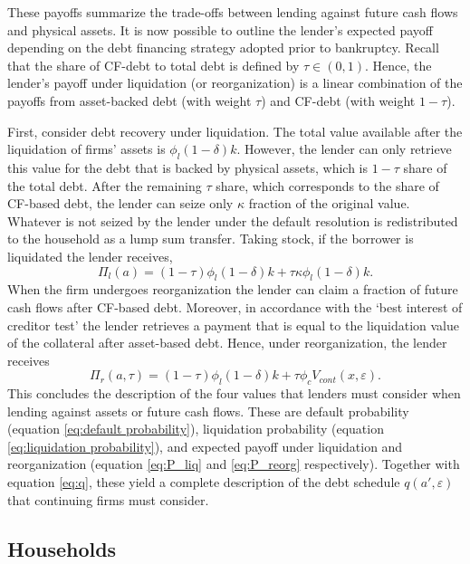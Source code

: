 \documentclass[12pt]{article}
\begin{document}
These payoffs summarize the trade-offs between lending against future cash flows and physical assets. It is now possible to outline the lender's expected payoff depending on the debt financing strategy adopted prior to bankruptcy. Recall that the share of CF-debt to total debt is defined by $\tau \in (0,1)$. Hence, the lender's payoff under liquidation (or reorganization) is a linear combination of the payoffs from asset-backed debt (with weight $\tau$) and CF-debt (with weight $1-\tau$). 

First, consider debt recovery under liquidation. The total value available after the liquidation of firms' assets is $\phi_l (1-\delta) k$. However, the lender can only retrieve this value for the debt that is backed by physical assets, which is $1-\tau$ share of the total debt. After the remaining $\tau$ share, which corresponds to the share of CF-based debt, the lender can seize only $\kappa$ fraction of the original value. Whatever is not seized by the lender under the default resolution is redistributed to the household as a lump sum transfer. Taking stock, if the borrower is liquidated the lender receives,
\begin{equation} \label{eq:P_liq} 
   \Pi_{l}(a) = (1-\tau) \phi_l (1-\delta) k +\tau \kappa \phi_l  (1-\delta) k. 
\end{equation}
When the firm undergoes reorganization the lender can claim a fraction of future cash flows after CF-based debt. Moreover, in accordance with the `best interest of creditor test' the lender retrieves a payment that is equal to the liquidation value of the collateral after asset-based debt. Hence, under reorganization, the lender receives
\begin{equation}  \label{eq:P_reorg}
   \Pi_{r}(a,\tau) = (1-\tau) \phi_l (1-\delta) k +\tau \phi_c V_{cont} (x, \varepsilon).
\end{equation}
This concludes the description of the four values that lenders must consider when lending against assets or future cash flows. These are default probability (equation \ref{eq:default probability}), liquidation probability (equation \ref{eq:liquidation probability}), and expected payoff under liquidation and reorganization (equation \ref{eq:P_liq} and \ref{eq:P_reorg} respectively). Together with equation \ref{eq:q}, these yield a complete description of the debt schedule $q(a', \varepsilon)$ that continuing firms must consider. 

\subsection{Households}\label{sec:hh}
\end{document}

